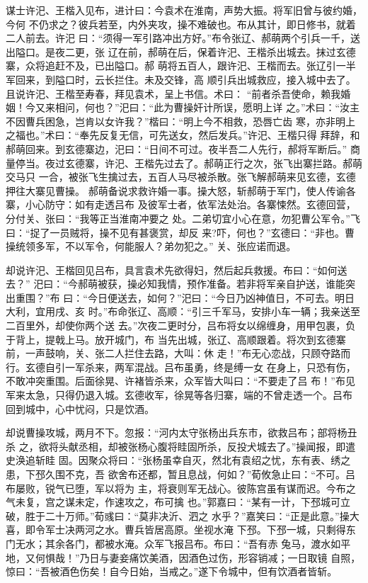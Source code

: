 谋士许汜、王楷入见布，进计曰：今袁术在淮南，声势大振。将军旧曾与彼约婚，今何
不仍求之？彼兵若至，内外夹攻，操不难破也。布从其计，即日修书，就着二人前去。许汜
曰：“须得一军引路冲出方好。”布令张辽、郝萌两个引兵一千，送出隘口。是夜二更，张
辽在前，郝萌在后，保着许汜、王楷杀出城去。抹过玄德寨，众将追赶不及，已出隘口。郝
萌将五百人，跟许汜、王楷而去。张辽引一半军回来，到隘口时，云长拦住。未及交锋，高
顺引兵出城救应，接入城中去了。且说许汜、王楷至寿春，拜见袁术，呈上书信。术曰：
“前者杀吾使命，赖我婚姻！今又来相问，何也？”汜曰：“此为曹操奸计所误，愿明上详
之。”术曰：“汝主不因曹兵困急，岂肯以女许我？”楷曰：“明上今不相救，恐唇亡齿
寒，亦非明上之福也。”术曰：“奉先反复无信，可先送女，然后发兵。”许汜、王楷只得
拜辞，和郝萌回来。到玄德寨边，汜曰：“日间不可过。夜半吾二人先行，郝将军断后。”
商量停当。夜过玄德寨，许汜、王楷先过去了。郝萌正行之次，张飞出寨拦路。郝萌交马只
一合，被张飞生擒过去，五百人马尽被杀散。张飞解郝萌来见玄德，玄德押往大寨见曹操。
郝萌备说求救许婚一事。操大怒，斩郝萌于军门，使人传谕各寨，小心防守：如有走透吕布
及彼军士者，依军法处治。各寨悚然。玄德回营，分付关、张曰：“我等正当淮南冲要之
处。二弟切宜小心在意，勿犯曹公军令。”飞曰：“捉了一员贼将，操不见有甚褒赏，却反
来?吓，何也？”玄德曰：“非也。曹操统领多军，不以军令，何能服人？弟勿犯之。”
关、张应诺而退。

却说许汜、王楷回见吕布，具言袁术先欲得妇，然后起兵救援。布曰：“如何送去？”
汜曰：“今郝萌被获，操必知我情，预作准备。若非将军亲自护送，谁能突出重围？”布
曰：“今日便送去，如何？”汜曰：“今日乃凶神值日，不可去。明日大利，宜用戌、亥
时。”布命张辽、高顺：“引三千军马，安排小车一辆；我亲送至二百里外，却使你两个送
去。”次夜二更时分，吕布将女以绵缠身，用甲包裹，负于背上，提戟上马。放开城门，布
当先出城，张辽、高顺跟着。将次到玄德寨前，一声鼓响，关、张二人拦住去路，大叫：休
走！”布无心恋战，只顾夺路而行。玄德自引一军杀来，两军混战。吕布虽勇，终是缚一女
在身上，只恐有伤，不敢冲突重围。后面徐晃、许褚皆杀来，众军皆大叫曰：“不要走了吕
布！”布见军来太急，只得仍退入城。玄德收军，徐晃等各归寨，端的不曾走透一个。吕布
回到城中，心中忧闷，只是饮酒。

却说曹操攻城，两月不下。忽报：“河内太守张杨出兵东市，欲救吕布；部将杨丑杀
之，欲将头献丞相，却被张杨心腹将眭固所杀，反投犬城去了。”操闻报，即遣史涣追斩眭
固。因聚众将曰：“张杨虽幸自灭，然北有袁绍之忧，东有表、绣之患，下邳久围不克，吾
欲舍布还都，暂且息战，何如？”荀攸急止曰：“不可。吕布屡败，锐气已堕，军以将为
主，将衰则军无战心。彼陈宫虽有谋而迟。今布之气未复，宫之谋未定，作速攻之，布可擒
也。”郭嘉曰：“某有一计，下邳城可立破，胜于二十万师。”荀彧曰：“莫非决沂、泗之
水乎？”嘉笑曰：“正是此意。”操大喜，即令军士决两河之水。曹兵皆居高原。坐视水淹
下邳。下邳一城，只剩得东门无水；其余各门，都被水淹。众军飞报吕布。布曰：“吾有赤
兔马，渡水如平地，又何惧哉！”乃日与妻妾痛饮美酒，因酒色过伤，形容销减；一日取镜
自照，惊曰：“吾被酒色伤矣！自今日始，当戒之。”遂下令城中，但有饮酒者皆斩。

